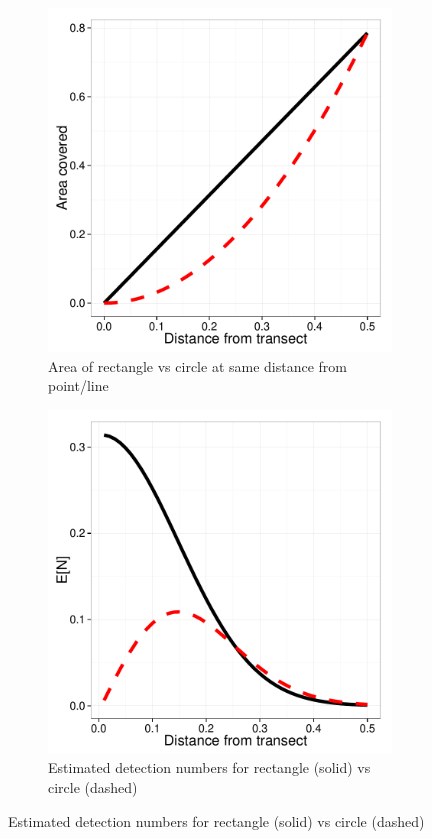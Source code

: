\documentclass[12pt]{article}
\begin{document}
\begin{figure}
	\centering
	\caption{Squares (Line Transect, solid) vs. Circles (Point Transect, dashed)}
	\begin{subfigure}[b]{0.45\textwidth}
		\includegraphics[width=\textwidth]{../images/rect-circ-area.pdf}
		\caption{Area of rectangle vs circle at same distance from point/line}
	\end{subfigure}
	\begin{subfigure}[b]{0.45\textwidth}
		\includegraphics[width=\textwidth]{../images/rect-circ-detection.pdf}
		\caption{Estimated detection numbers for rectangle (solid) vs circle (dashed)}
	\end{subfigure}
	

\end{figure}
\end{document}
